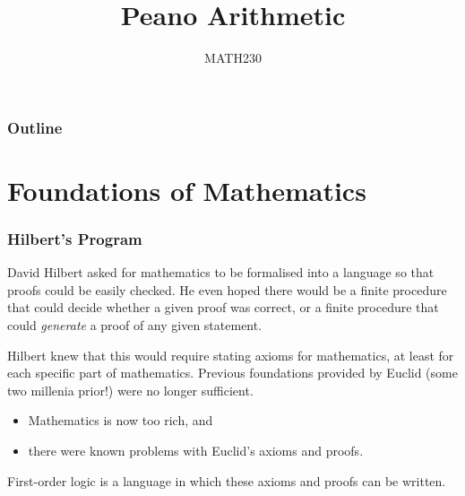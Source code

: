 \documentclass{beamer}
\title{Peano Arithmetic}
\author{MATH230}
\institute{Te Kura P\=angarau \\ Te Whare W\=ananga o Waitaha}
\date{}
\theoremstyle{indentDefn} \newtheorem{defn}[]{Definition}
\begin{document}
\begin{frame}

  \titlepage

\end{frame}

\begin{frame}
  \frametitle{Outline}

  \tableofcontents

\end{frame}

\section{Foundations of Mathematics}

\begin{frame}
	\frametitle{Hilbert's Program}
	
	David Hilbert asked for mathematics to be formalised into a language so that proofs could be easily checked. He even hoped there would be a finite procedure that could decide whether a given proof was correct, or a finite procedure that could \textit{generate} a proof of any given statement. 
	
	\vspace{0.2cm}
	
	Hilbert knew that this would require stating axioms for mathematics, at least for each specific part of mathematics. Previous foundations provided by Euclid (some two millenia prior!) were no longer sufficient.
	
	\vspace{0.2cm}
	
	\begin{itemize}
		\item Mathematics is now too rich, and 
		\item there were known problems with Euclid's axioms and proofs. 
	\end{itemize}

	\vspace{0.2cm}
	
	First-order logic is a language in which these axioms and proofs can be written. 
	
\end{frame}
\end{document}
